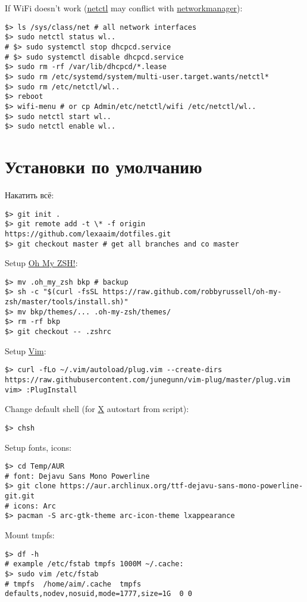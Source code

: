 \documentclass[a4paper, 12pt]{article}
\begin{document}
If WiFi doesn't work (\url{netctl} may conflict with \url{networkmanager}):
\begin{lstlisting}
$> ls /sys/class/net # all network interfaces
$> sudo netctl status wl..
# $> sudo systemctl stop dhcpcd.service
# $> sudo systemctl disable dhcpcd.service
$> sudo rm -rf /var/lib/dhcpcd/*.lease
$> sudo rm /etc/systemd/system/multi-user.target.wants/netctl*
$> sudo rm /etc/netctl/wl..
$> reboot
$> wifi-menu # or cp Admin/etc/netctl/wifi /etc/netctl/wl..
$> sudo netctl start wl..
$> sudo netctl enable wl..
\end{lstlisting}

\section{Установки по умолчанию}

Накатить всё:
\begin{lstlisting}
$> git init .
$> git remote add -t \* -f origin https://github.com/lexaaim/dotfiles.git
$> git checkout master # get all branches and co master
\end{lstlisting}

Setup \url{Oh My ZSH!}:
\begin{lstlisting}
$> mv .oh_my_zsh bkp # backup
$> sh -c "$(curl -fsSL https://raw.github.com/robbyrussell/oh-my-zsh/master/tools/install.sh)"
$> mv bkp/themes/... .oh-my-zsh/themes/
$> rm -rf bkp
$> git checkout -- .zshrc
\end{lstlisting}

Setup \url{Vim}:
\begin{lstlisting}
$> curl -fLo ~/.vim/autoload/plug.vim --create-dirs  https://raw.githubusercontent.com/junegunn/vim-plug/master/plug.vim
vim> :PlugInstall
\end{lstlisting}

Change default shell (for \url{X} autostart from  script):
\begin{lstlisting}
$> chsh
\end{lstlisting}

Setup fonts, icons:
\begin{lstlisting}
$> cd Temp/AUR
# font: Dejavu Sans Mono Powerline
$> git clone https://aur.archlinux.org/ttf-dejavu-sans-mono-powerline-git.git
# icons: Arc
$> pacman -S arc-gtk-theme arc-icon-theme lxappearance
\end{lstlisting}

Mount tmpfs:
\begin{lstlisting}
$> df -h
# example /etc/fstab tmpfs 1000M ~/.cache:
$> sudo vim /etc/fstab
# tmpfs  /home/aim/.cache  tmpfs  defaults,nodev,nosuid,mode=1777,size=1G  0 0
\end{lstlisting}
\end{document}
